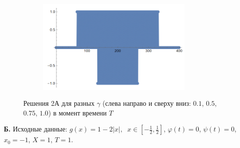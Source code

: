 \documentclass[12pt, a4paper]{article}
\begin{document}
\begin{figure}[H]
\begin{subfigure}{.5\textwidth}
		\end{subfigure}%
		\begin{subfigure}{.5\textwidth}
			\centering
			\includegraphics[width=0.85\textwidth]{test1-1}
		\end{subfigure}
		\caption{Решения 2А для разных $\gamma$ (слева направо и сверху вниз: $0.1$, $0.5$, $0.75$, $1.0$) в момент времени $T$}
	\end{figure}
	
	\textbf{Б.}  Исходные данные: $g(x)=1-2|x|,\phantom{x}x\in[-\frac12,\frac12]$, $\varphi(t)=0$, $\psi(t)=0$, $x_0=-1$, $X=1$, $T= 1$. 
	
\end{document}
